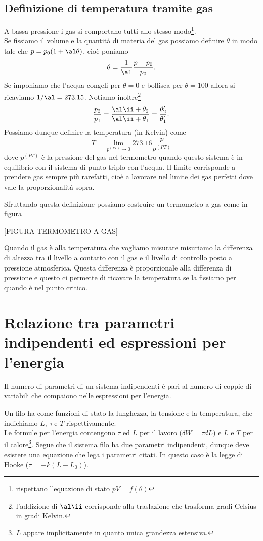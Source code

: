 \subsection{Definizione di temperatura tramite gas}
A bassa pressione i gas si comportano tutti allo stesso modo\footnote{rispettano l'equazione di stato $pV=f(\theta)$}.\\
Se fissiamo il volume e la quantit\`a di materia del gas possiamo definire $\theta$ in modo tale che $p=p_0(1+\al\theta)$, cio\`e poniamo 
\[\theta=\frac1\al\frac{p-p_0}{p_0}.\] 
Se imponiamo che l'acqua congeli per $\theta=0$ e bollisca per $\theta=100$ allora si ricaviamo $1/\al=273.15$. Notiamo inoltre\footnote{l'addizione di $\al\ii$ corrisponde alla traslazione che trasforma gradi Celsius in gradi Kelvin.}
\[\frac{p_2}{p_1}=\frac{\al\ii+\theta_2}{\al\ii +\theta_1}=\frac{\theta_2'}{\theta_1'}.\]
Possiamo dunque definire la temperatura (in Kelvin) come
\[T=\lim_{p^{(PT)}\to 0}273.16 \frac{p}{p^{(PT)}}\]
dove $p^{(PT)}$ \`e la pressione del gas nel termometro quando questo sistema \`e in equilibrio con il sistema di punto triplo con l'acqua. Il limite corrisponde a prendere gas sempre pi\`u rarefatti, cio\`e a lavorare nel limite dei gas perfetti dove vale la proporzionalit\`a sopra.
\medskip

\noindent Sfruttando questa definizione possiamo costruire un termometro a gas come in figura

[FIGURA TERMOMETRO A GAS]

\noindent Quando il gas \`e alla temperatura che vogliamo misurare misuriamo la differenza di altezza tra il livello a contatto con il gas e il livello di controllo posto a pressione atmosferica. Questa differenza \`e proporzionale alla differenza di pressione e questo ci permette di ricavare la temperatura se la fissiamo per quando \`e nel punto critico.

\section{Relazione tra parametri indipendenti ed espressioni per l'energia}

\begin{fact}
Il numero di parametri di un sistema indipendenti \`e pari al numero di coppie di variabili che compaiono nelle espressioni per l'energia.
\end{fact}

\begin{example}[Filo]
Un filo ha come funzioni di stato la lunghezza, la tensione e la temperatura, che indichiamo $L,\ \tau\ \text{e }T$ rispettivamente.\\
Le formule per l'energia contengono $\tau$ ed $L$ per il lavoro ($\delta W=\tau dL$) e $L$ e $T$ per il calore\footnote{$L$ appare implicitamente in quanto unica grandezza estensiva.}. Segue che il sistema filo ha due parametri indipendenti, dunque deve esistere una equazione che lega i parametri citati. In questo caso \`e la legge di Hooke ($\tau=-k(L-L_0)$).
\end{example}

